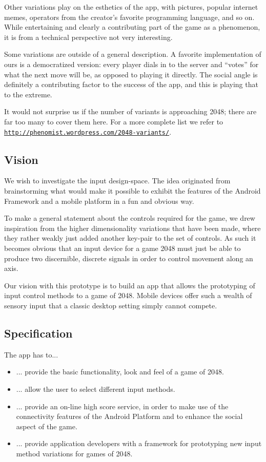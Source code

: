\documentclass[a4paper, 12pt]{article}
\newcommand{\link}[1]{\href{http://#1}{\texttt{#1}}}
\begin{document}
Other variations play on the esthetics of the app, with pictures,
popular internet memes, operators from the creator's favorite
programming language, and so on. While entertaining and clearly a
contributing part of the game as a phenomenon, it is from a technical
perspective not very interesting.

Some variations are outside of a general description. A favorite
implementation of ours is a democratized version: every player dials
in to the server and ``votes'' for what the next move will be, as
opposed to playing it directly. The social angle is definitely a
contributing factor to the success of the app, and this is playing
that to the extreme.

It would not surprise us if the number of variants is approaching
2048; there are far too many to cover them here. For a more complete
list we refer to \link{http://phenomist.wordpress.com/2048-variants/}.

\subsection{Vision}

We wish to investigate the input design-space. The idea originated
from brainstorming what would make it possible to exhibit the features
of the Android Framework and a mobile platform in a fun and obvious
way.

To make a general statement about the controls required for the game,
we drew inspiration from the higher dimensionality variations that
have been made, where they rather weakly just added another key-pair to
the set of controls. As such it becomes obvious that an input device
for a game 2048 must just be able to produce two discernible, discrete
signals in order to control movement along an axis. 

Our vision with this prototype is to build an app that allows the
prototyping of input control methods to a game of 2048. Mobile devices
offer such a wealth of sensory input that a classic desktop setting
simply cannot compete. 

\subsection{Specification}

The app has to...
\begin{itemize}
\item ... provide the basic functionality, look and feel of a game of 2048.
\item ... allow the user to select different input methods.
\item ... provide an on-line high score service, in order to make use
  of the connectivity features of the Android Platform and to enhance
  the social aspect of the game.
\item ... provide application developers with a framework for
  prototyping new input method variations for games of 2048.
\end{itemize}
\end{document}
